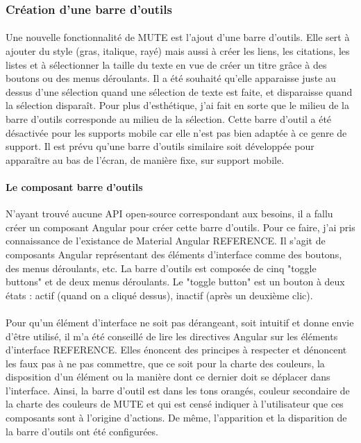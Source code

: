 \documentclass[12pt]{article}
\begin{document}
\subsubsection{Création d'une barre d'outils}
\paragraph{}
Une nouvelle fonctionnalité de MUTE est l'ajout d'une barre d'outils. Elle sert à ajouter du style (gras, italique, rayé) mais aussi à créer les liens, les citations, les listes et à sélectionner la taille du texte en vue de créer un titre grâce à des boutons ou des menus déroulants. Il a été souhaité qu'elle apparaisse juste au dessus d'une sélection quand une sélection de texte est faite, et disparaisse quand la sélection disparaît. Pour plus d'esthétique, j'ai fait en sorte que le milieu de la barre d'outils corresponde au milieu de la sélection. Cette barre d'outil a été désactivée pour les supports mobile car elle n'est pas bien adaptée à ce genre de support. Il est prévu qu'une barre d'outils similaire soit développée pour apparaître au bas de l'écran, de manière fixe, sur support mobile.
\paragraph{Le composant barre d'outils}
N'ayant trouvé aucune API open-source correspondant aux besoins, il a fallu créer un composant Angular pour créer cette barre d'outils. Pour ce faire, j'ai pris connaissance de l'existance de Material Angular REFERENCE. Il s'agit de composants Angular représentant des éléments d'interface comme des boutons, des menus déroulants, etc. La barre d'outils est composée de cinq "toggle buttons" et de deux menus déroulants. Le "toggle button" est un bouton à deux états : actif (quand on a cliqué dessus), inactif (après un deuxième clic).
\paragraph{}
Pour qu'un élément d'interface ne soit pas dérangeant, soit intuitif et donne envie d'être utilisé, il m'a été conseillé de lire les directives Angular sur les éléments d'interface REFERENCE. Elles énoncent des principes à respecter et dénoncent les faux pas à ne pas commettre, que ce soit pour la charte des couleurs, la disposition d'un élément ou la manière dont ce dernier doit se déplacer dans l'interface. Ainsi, la barre d'outil est dans les tons orangés, couleur secondaire de la charte des couleurs de MUTE et qui est censé indiquer à l'utilisateur que ces composants sont à l'origine d'actions. De même, l'apparition et la disparition de la barre d'outils ont été configurées.
\end{document}
